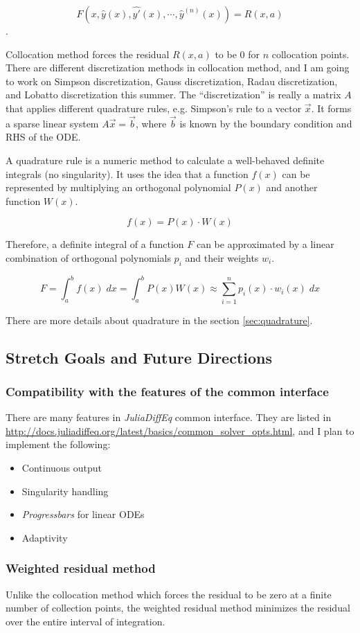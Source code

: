 \documentclass[a4paper,11pt,onecolumn]{article}
\begin{document}
\[F(x, \hat{y}(x), \hat{y'}(x), \cdots, \hat{y}^{(n)}(x)) = R(x,a)\].

Collocation method forces the residual $R(x,a)$ to be $0$ for $n$ collocation points.
There are different discretization methods in collocation method, and I am going to work on
Simpson discretization, Gauss discretization, Radau discretization, and Lobatto
discretization this summer. The ``discretization'' is really a matrix $A$ that applies different
quadrature rules, e.g. Simpson's rule to a vector $\vec{x}$. It forms a sparse linear system
$A\vec{x}=\vec{b}$, where $\vec{b}$ is known by the boundary condition and RHS of the ODE.

A quadrature rule is a numeric method to calculate a well-behaved definite integrals (no singularity).
It uses the idea that a function $f(x)$ can be represented by multiplying an orthogonal polynomial $P(x)$
and another function $W(x)$.

\[f(x) = P(x)\cdot W(x)\]

Therefore, a definite integral of a function $F$ can be approximated by a linear combination of orthogonal
polynomials $p_i$ and their weights $w_i$.

\[F = \int_{a}^{b}f(x)\;dx = \int_{a}^{b}P(x)W(x) \approx \sum_{i=1}^{n}p_i(x)\cdot w_i(x)\;dx\]

There are more details about quadrature in the section \ref{sec:quadrature}.

\subsection{Stretch Goals and Future Directions}
\subsubsection{Compatibility with the features of the common interface}
There are many features in \textit{JuliaDiffEq} common interface. They are listed in
\url{http://docs.juliadiffeq.org/latest/basics/common_solver_opts.html}, and I plan to
implement the following:
\begin{itemize}
	\item Continuous output
	\item Singularity handling
	\item \textit{Progressbars} for linear ODEs
	\item Adaptivity
\end{itemize}


\subsubsection{Weighted residual method}
Unlike the collocation method which forces the residual to be zero at a finite number of
collection points, the weighted residual method minimizes the residual over the entire
interval of integration.
\end{document}
